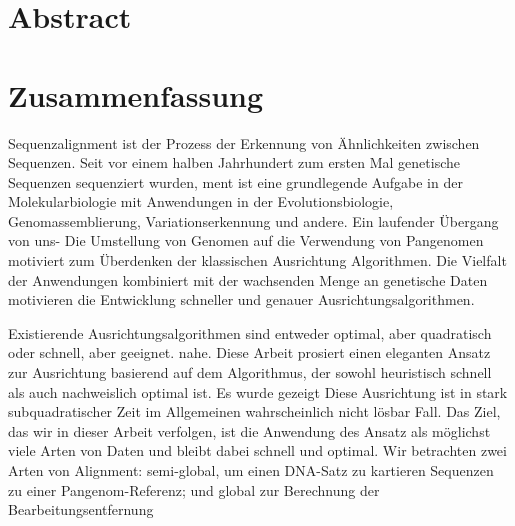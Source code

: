 \begingroup
\let\clearpage\relax
\let\cleardoublepage\relax
\let\cleardoublepage\relax

\chapter*{Abstract}


\endgroup

\cleardoublepage%

\begingroup
\let\clearpage\relax
\let\cleardoublepage\relax
\let\cleardoublepage\relax

\chapter*{Zusammenfassung}



Sequenzalignment ist der Prozess der Erkennung von Ähnlichkeiten zwischen
Sequenzen. Seit vor einem halben Jahrhundert zum ersten Mal genetische Sequenzen
sequenziert wurden, ment ist eine grundlegende Aufgabe in der Molekularbiologie
mit Anwendungen in der Evolutionsbiologie, Genomassemblierung,
Variationserkennung und andere. Ein laufender Übergang von uns- Die Umstellung
von Genomen auf die Verwendung von Pangenomen motiviert zum Überdenken der
klassischen Ausrichtung Algorithmen. Die Vielfalt der Anwendungen kombiniert mit
der wachsenden Menge an genetische Daten motivieren die Entwicklung schneller
und genauer Ausrichtungsalgorithmen.

Existierende Ausrichtungsalgorithmen sind entweder optimal, aber quadratisch
oder schnell, aber geeignet. nahe. Diese Arbeit prosiert einen eleganten Ansatz
zur Ausrichtung basierend auf dem \A Algorithmus, der sowohl heuristisch schnell
als auch nachweislich optimal ist. Es wurde gezeigt Diese Ausrichtung ist in
stark subquadratischer Zeit im Allgemeinen wahrscheinlich nicht lösbar Fall. Das
Ziel, das wir in dieser Arbeit verfolgen, ist die Anwendung des \A Ansatz als
möglichst viele Arten von Daten und bleibt dabei schnell und optimal. Wir
betrachten zwei Arten von Alignment: semi-global, um einen DNA-Satz zu kartieren
Sequenzen zu einer Pangenom-Referenz; und global zur Berechnung der
Bearbeitungsentfernung


